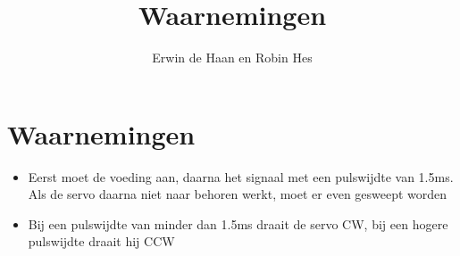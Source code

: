 \documentclass[11pt]{article} %
\title{Waarnemingen}
\author{Erwin de Haan en Robin Hes}
\begin{document}
\maketitle

\section{Waarnemingen}

\begin{itemize}
    \item Eerst moet de voeding aan, daarna het signaal met een pulswijdte van 1.5ms. Als de servo daarna niet naar behoren werkt, moet er even gesweept worden
    \item Bij een pulswijdte van minder dan 1.5ms draait de servo CW, bij een hogere pulswijdte draait hij CCW
\end{itemize}
\end{document}
